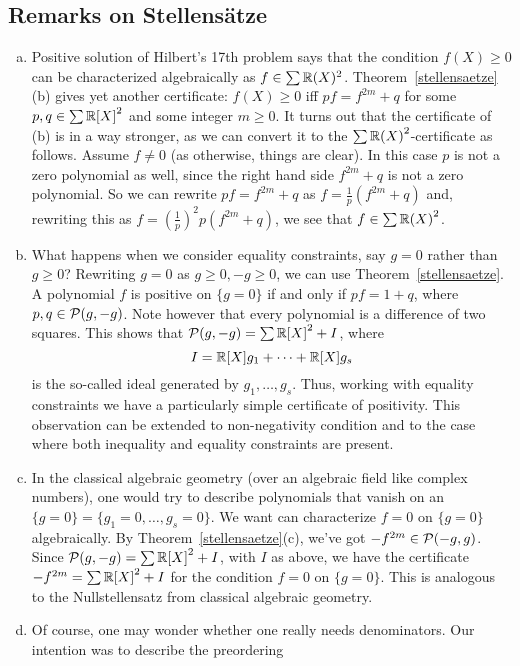 \subsection{Remarks on Stellensätze}

	\begin{enumerate}[(a)]
		\item Positive solution of Hilbert's 17th problem says that the condition $f(X) \ge 0$ can be characterized algebraically as $f \in \sum \mathbb{R}(X)^2$. Theorem~\ref{stellensaetze}(b) gives yet another certificate: $f(X) \ge 0$ iff $p f = f^{2m} + q$ for some $p, q \in \sum {\mathbb{R}[X]}^2$ and some integer $m \ge 0$. It turns out that the certificate of (b) is in a way stronger, as we can convert it to the $\sum {\mathbb{R}(X)}^2$-certificate as follows. Assume $f \ne 0$ (as otherwise, things are clear). In this case $p$ is not a zero polynomial as well, since the right hand side $f^{2m} + q$ is not a zero polynomial. So we can rewrite $p f = f^{2m}+ q$ as $f = \frac{1}{p} (f^{2m} + q)$ and, rewriting this as $f = (\frac{1}{p})^2 p ( f^{2m} + q)$, we see that $f \in \sum {\mathbb{R}(X)}^2$.
		\item What happens when we consider equality constraints, say $g=0$ rather than $g \ge 0$? Rewriting $g=0$ as $g \ge 0, -g \ge 0$, we can use Theorem~\ref{stellensaetze}. A polynomial $f$ is positive on $\{g=0\}$ if and only if $p f = 1+q$, where $p,q \in \mathcal{P}(g,-g)$. Note however that every polynomial is a difference of two squares. This shows that $\mathcal{P}(g,-g) = \sum {\mathbb{R}[X]}^2 + I$, where
		\[
			I = \mathbb{R}[X] g_1 + \cdots + \mathbb{R}[X] g_s
		\]
		is the so-called ideal generated by $g_1,\ldots,g_s$. Thus, working with equality constraints we have a particularly simple certificate of positivity. This observation can be extended to non-negativity condition and to the case where both inequality and equality constraints are present. 
		\item In the classical algebraic geometry (over an algebraic field like complex numbers), one would try to describe polynomials that vanish on an $\{g=0\} = \{g_1=0,\ldots,g_s=0\}$. We want can characterize  $f=0$ on $\{g=0\}$ algebraically. By Theorem~\ref{stellensaetze}(c), we've got $-f^{2m} \in \mathcal{P}(-g,g)$. Since $\mathcal{P}(g,-g) = \sum {\mathbb{R}[X]}^2 +I$, with $I$ as above, we have the certificate $-f^{2m} = \sum {\mathbb{R}[X]}^2 +I$ for the condition $f = 0$ on $\{g=0\}$. This is analogous to the Nullstellensatz from classical algebraic geometry. 
		\item Of course, one may wonder whether one really needs denominators. Our intention was to describe the preordering 

\end{enumerate}
